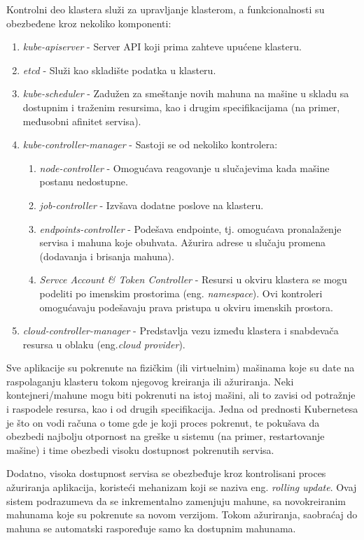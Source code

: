 \documentclass[12pt,oneside]{memoir}
\begin{document}
Kontrolni deo klastera služi za upravljanje klasterom, a funkcionalnosti su obezbeđene kroz nekoliko komponenti:
\begin{enumerate}
\item \emph{kube-apiserver} - Server API koji prima zahteve upućene klasteru.
\item \emph{etcd} - Služi kao skladište podatka u klasteru.
\item \emph{kube-scheduler} - Zadužen za smeštanje novih mahuna na mašine u skladu sa dostupnim i traženim resursima, kao i drugim specifikacijama (na primer, međusobni afinitet servisa).
\item \emph{kube-controller-manager} - Sastoji se od nekoliko kontrolera:
	\begin{enumerate}
	\item \emph{node-controller} - Omogućava reagovanje u slučajevima kada mašine postanu nedostupne.
	\item \emph{job-controller} - Izvšava dodatne poslove na klasteru.
	\item \emph{endpoints-controller} - Podešava endpointe, tj. omogućava pronalaženje servisa i mahuna koje obuhvata. Ažurira adrese u slučaju promena (dodavanja i brisanja mahuna).
	\item \emph{Servce Account \& Token Controller} - Resursi u okviru klastera se mogu podeliti po imenskim prostorima (eng. \emph{namespace}). Ovi kontroleri omogućavaju podešavaju prava pristupa u okviru imenskih prostora.
	\end{enumerate}
\item \emph{cloud-controller-manager} - Predstavlja vezu između klastera i snabdevača resursa u oblaku (eng.\emph{cloud provider}).
\end{enumerate}
Sve aplikacije su pokrenute na fizičkim (ili virtuelnim) mašinama koje su date na raspolaganju klasteru tokom njegovog kreiranja ili ažuriranja. Neki kontejneri/mahune mogu biti pokrenuti na istoj mašini, ali to zavisi od potražnje i raspodele resursa, kao i od drugih specifikacija. Jedna od prednosti Kubernetesa je što on vodi računa o tome gde je koji proces pokrenut, te pokušava da obezbedi najbolju otpornost na greške u sistemu (na primer, restartovanje mašine) i time obezbedi visoku dostupnost pokrenutih servisa.

Dodatno, visoka dostupnost servisa se obezbeđuje kroz kontrolisani proces ažuriranja aplikacija, koristeći mehanizam koji se naziva eng. \emph{rolling update}. Ovaj sistem podrazumeva da se inkrementalno zamenjuju mahune, sa novokreiranim mahunama koje su pokrenute sa novom verzijom. Tokom ažuriranja, saobraćaj do mahuna se automatski raspoređuje samo ka dostupnim mahunama.
\end{document}
